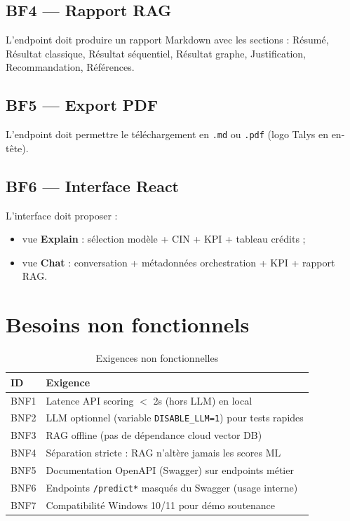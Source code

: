 \subsection{BF4 — Rapport RAG}

L'endpoint  doit produire un rapport Markdown avec les sections :
Résumé, Résultat classique, Résultat séquentiel, Résultat graphe, Justification, Recommandation, Références.

\subsection{BF5 — Export PDF}

L'endpoint  doit permettre le téléchargement en \texttt{.md} ou \texttt{.pdf} (logo Talys en en-tête).

\subsection{BF6 — Interface React}

L'interface doit proposer :
\begin{itemize}[leftmargin=*]
  \item vue \textbf{Explain} : sélection modèle + CIN + KPI + tableau crédits ;
  \item vue \textbf{Chat} : conversation + métadonnées orchestration + KPI + rapport RAG.
\end{itemize}

\section{Besoins non fonctionnels}

\begin{table}[H]
  \centering
  \caption{Exigences non fonctionnelles}
  \begin{tabular}{|l|p{10cm}|}
    \hline
    \textbf{ID} & \textbf{Exigence} \\
    \hline
    BNF1 & Latence API scoring $<$ 2s (hors LLM) en local \\
    \hline
    BNF2 & LLM optionnel (variable \texttt{DISABLE\_LLM=1}) pour tests rapides \\
    \hline
    BNF3 & RAG offline (pas de dépendance cloud vector DB) \\
    \hline
    BNF4 & Séparation stricte : RAG n'altère jamais les scores ML \\
    \hline
    BNF5 & Documentation OpenAPI (Swagger) sur endpoints métier \\
    \hline
    BNF6 & Endpoints \texttt{/predict*} masqués du Swagger (usage interne) \\
    \hline
    BNF7 & Compatibilité Windows 10/11 pour démo soutenance \\
    \hline
  \end{tabular}
\end{table}

